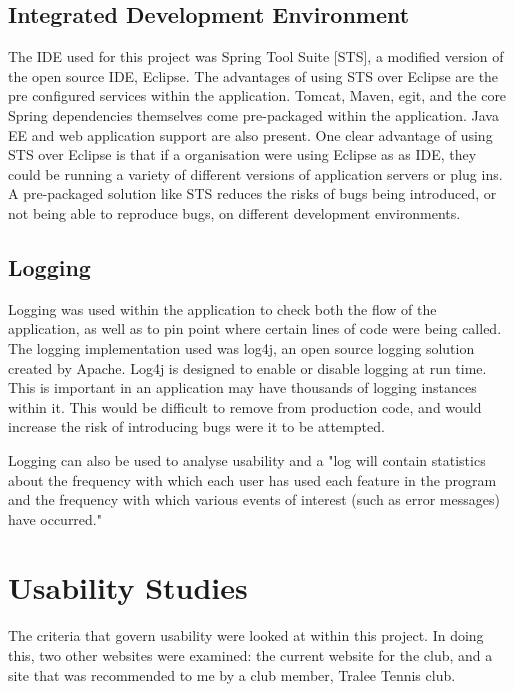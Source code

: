 \subsection{Integrated Development Environment}

The IDE used for this project was Spring Tool Suite [STS], a modified version of the open source IDE, Eclipse. The advantages of using STS over Eclipse are the pre configured services within the application. Tomcat, Maven, egit, and the core Spring dependencies themselves come pre-packaged within the application. Java EE and web application support are also present. One clear advantage of using STS over Eclipse is that if a organisation were using Eclipse as as IDE, they could be running a variety of different versions of application servers or plug ins. A pre-packaged solution like STS reduces the risks of bugs being introduced, or not being able to reproduce bugs, on different development environments.

\subsection{Logging}

Logging was used within the application to check both the flow of the application, as well as to pin point where certain lines of code were being called. The logging implementation used was log4j, an open source logging solution created by Apache. Log4j is designed to enable or disable logging at run time. This is important in an application may have thousands of logging instances within it. This would be difficult to remove from production code, and would increase the risk of introducing bugs were it to be attempted. 

Logging can also be used to analyse usability and a "log will contain statistics about the frequency with which each user has used each feature in the program and the frequency with which various events of interest (such as error messages) have occurred." \parencite{holzinger2005usability}

\section{Usability Studies}

The criteria that govern usability were looked at within this project. In doing this, two other websites were examined: the current website for the club, and a site that was recommended to me by a club member, Tralee Tennis club. 


